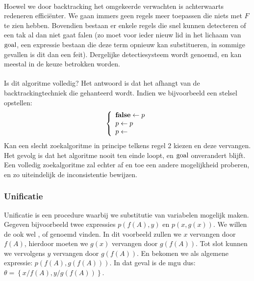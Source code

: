 \paragraph{}
Hoewel we door backtracking het omgekeerde verwachten is achterwaarts redeneren effici\"enter. We gaan immers geen regels meer toepassen die niets met $F$ te zien hebben. Bovendien bestaan er enkele regels die snel kunnen detecteren of een tak al dan niet gaat falen (zo moet voor ieder nieuw lid in het lichaam van $\mbox{goal}$, een expressie bestaan die deze term opnieuw kan substitueren, in sommige gevallen is dit dan een feit). Dergelijke detectiesysteem wordt  genoemd, en kan meestal in de keuze betrokken worden.
\paragraph{}Is dit algoritme volledig? Het antwoord is dat het afhangt van de backtrackingtechniek die gehanteerd wordt. Indien we bijvoorbeeld een stelsel opstellen:
\begin{equation}
\left\{\begin{array}{l}
\mbox{\bf false}\leftarrow p\\
p\leftarrow p\\
p\leftarrow
\end{array}\right.
\end{equation}
Kan een slecht zoekalgoritme in principe telkens regel 2 kiezen en deze vervangen. Het gevolg is dat het algoritme nooit ten einde loopt, en $\mbox{goal}$ onverandert blijft. Een volledig zoekalgoritme zal echter af en toe een andere mogelijkheid proberen, en zo uiteindelijk de inconsistentie bewijzen.
\subsubsection{Unificatie}
\label{sss:unification}
Unificatie is een procedure waarbij we substitutie van variabelen mogelijk maken. Gegeven bijvoorbeeld twee expressies $p\left(f\left(A\right),y\right)$ en $p\left(x,g\left(x\right)\right)$. We willen de  ook wel ,  of  genoemd vinden. In dit voorbeeld zullen we $x$ vervangen door $f\left(A\right)$, hierdoor moeten we $g\left(x\right)$ vervangen door $g\left(f\left(A\right)\right)$. Tot slot kunnen we vervolgens $y$ vervangen door $g\left(f\left(A\right)\right)$. En bekomen we als algemene expressie: $p\left(f\left(A\right),g\left(f\left(A\right)\right)\right)$. In dat geval is de mgu dus: $\theta=\left\{x/f\left(A\right),y/g\left(f\left(A\right)\right)\right\}$.

